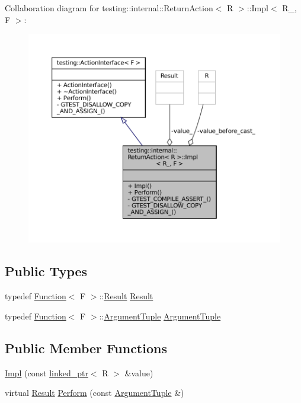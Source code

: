 Collaboration diagram for testing\+:\+:internal\+:\+:Return\+Action$<$ R $>$\+:\+:Impl$<$ R\+\_\+, F $>$\+:
\nopagebreak
\begin{figure}[H]
\begin{center}
\leavevmode
\includegraphics[width=350pt]{classtesting_1_1internal_1_1ReturnAction_1_1Impl__coll__graph}
\end{center}
\end{figure}
\subsection*{Public Types}
\begin{DoxyCompactItemize}
\item 
typedef \hyperlink{structtesting_1_1internal_1_1Function}{Function}$<$ F $>$\+::\hyperlink{classtesting_1_1internal_1_1ReturnAction_1_1Impl_a681fdf18258f86ea31efe0c55217e571}{Result} \hyperlink{classtesting_1_1internal_1_1ReturnAction_1_1Impl_a681fdf18258f86ea31efe0c55217e571}{Result}
\item 
typedef \hyperlink{structtesting_1_1internal_1_1Function}{Function}$<$ F $>$\+::\hyperlink{classtesting_1_1ActionInterface_af72720d864da4d606629e83edc003511}{Argument\+Tuple} \hyperlink{classtesting_1_1internal_1_1ReturnAction_1_1Impl_ae6311cbcb9aefd71304a7e40b24be62b}{Argument\+Tuple}
\end{DoxyCompactItemize}
\subsection*{Public Member Functions}
\begin{DoxyCompactItemize}
\item 
\hyperlink{classtesting_1_1internal_1_1ReturnAction_1_1Impl_afde6b8872e55f42ee105fb70b3ceccb2}{Impl} (const \hyperlink{classtesting_1_1internal_1_1linked__ptr}{linked\+\_\+ptr}$<$ R $>$ \&value)
\item 
virtual \hyperlink{classtesting_1_1internal_1_1ReturnAction_1_1Impl_a681fdf18258f86ea31efe0c55217e571}{Result} \hyperlink{classtesting_1_1internal_1_1ReturnAction_1_1Impl_ad643ea98eada205da6c4bcfb6c66cd2c}{Perform} (const \hyperlink{classtesting_1_1ActionInterface_af72720d864da4d606629e83edc003511}{Argument\+Tuple} \&)
\end{DoxyCompactItemize}
